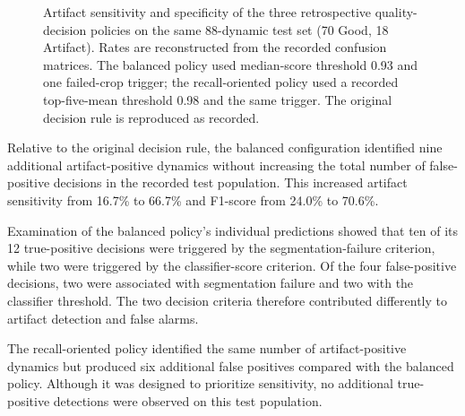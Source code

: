 \begin{figure}[htbp]
\centering
{}
\caption{Artifact sensitivity and specificity of the three retrospective quality-decision policies on the same 88-dynamic test set (70 Good, 18 Artifact). Rates are reconstructed from the recorded confusion matrices. The balanced policy used median-score threshold 0.93 and one failed-crop trigger; the recall-oriented policy used a recorded top-five-mean threshold 0.98 and the same trigger. The original decision rule is reproduced as recorded.}
\label{fig:results_dynamic_policies_reconstructed}
\end{figure}

Relative to the original decision rule, the balanced configuration identified nine additional artifact-positive dynamics without increasing the total number of false-positive decisions in the recorded test population. This increased artifact sensitivity from 16.7\% to 66.7\% and F1-score from 24.0\% to 70.6\%.

Examination of the balanced policy's individual predictions showed that ten of its 12 true-positive decisions were triggered by the segmentation-failure criterion, while two were triggered by the classifier-score criterion. Of the four false-positive decisions, two were associated with segmentation failure and two with the classifier threshold. The two decision criteria therefore contributed differently to artifact detection and false alarms.

The recall-oriented policy identified the same number of artifact-positive dynamics but produced six additional false positives compared with the balanced policy. Although it was designed to prioritize sensitivity, no additional true-positive detections were observed on this test population.

